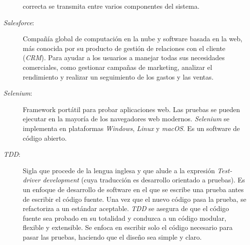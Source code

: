 \begin{description}
    correcta se transmita entre varios componentes del sistema.
\item [\emph{Salesforce}:] Compañía global de computación en la nube y software
    basada en la web, más conocida por su producto de gestión de relaciones con
    el cliente (\emph{CRM}). Para ayudar a los usuarios a manejar todas sus
    necesidades comerciales, como gestionar campañas de marketing, analizar el
    rendimiento y realizar un seguimiento de los gastos y las ventas.
\item [\emph{Selenium}:] Framework portátil para probar aplicaciones web. Las
    pruebas se pueden ejecutar en la mayoría de los navegadores web modernos.
    \emph{Selenium} se implementa en plataformas \emph{Windows}, \emph{Linux} y
    \emph{macOS}. Es un software de código abierto.
\item [\emph{TDD}:] Sigla que procede de la lengua inglesa y que alude a la
    expresión \emph{Test-driver development} (cuya traducción es desarrollo
    orientado a pruebas). Es un enfoque de desarrollo de software en el que se
    escribe una prueba antes de escribir el código fuente. Una vez que el nuevo
    código pasa la prueba, se refactoriza a un estándar aceptable. \emph{TDD} se
    asegura de que el código fuente sea probado en su totalidad y conduzca a un
    código modular, flexible y extensible. Se enfoca en escribir solo el código
    necesario para pasar las pruebas, haciendo que el diseño sea simple y claro.
\end{description}

